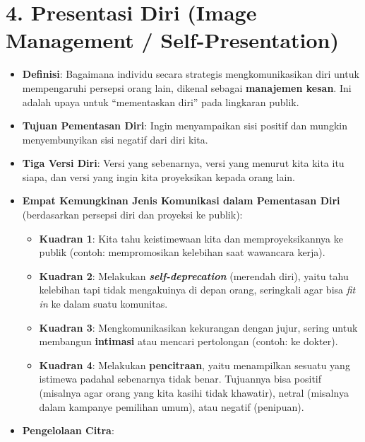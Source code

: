 \documentclass[
  letterpaper,
  DIV=11,
  numbers=noendperiod]{scrreprt}
\providecommand{\tightlist}{%
  \setlength{\itemsep}{0pt}\setlength{\parskip}{0pt}}
\begin{document}
\section{4. Presentasi Diri (Image Management /
Self-Presentation)}\label{presentasi-diri-image-management-self-presentation}

\begin{itemize}
\tightlist
\item
  \textbf{Definisi}: Bagaimana individu secara strategis
  mengkomunikasikan diri untuk mempengaruhi persepsi orang lain, dikenal
  sebagai \textbf{manajemen kesan}. Ini adalah upaya untuk ``mementaskan
  diri'' pada lingkaran publik.
\item
  \textbf{Tujuan Pementasan Diri}: Ingin menyampaikan sisi positif dan
  mungkin menyembunyikan sisi negatif dari diri kita.
\item
  \textbf{Tiga Versi Diri}: Versi yang sebenarnya, versi yang menurut
  kita kita itu siapa, dan versi yang ingin kita proyeksikan kepada
  orang lain.
\item
  \textbf{Empat Kemungkinan Jenis Komunikasi dalam Pementasan Diri}
  (berdasarkan persepsi diri dan proyeksi ke publik):

  \begin{itemize}
  \tightlist
  \item
    \textbf{Kuadran 1}: Kita tahu keistimewaan kita dan
    memproyeksikannya ke publik (contoh: mempromosikan kelebihan saat
    wawancara kerja).
  \item
    \textbf{Kuadran 2}: Melakukan \textbf{\emph{self-deprecation}}
    (merendah diri), yaitu tahu kelebihan tapi tidak mengakuinya di
    depan orang, seringkali agar bisa \emph{fit in} ke dalam suatu
    komunitas.
  \item
    \textbf{Kuadran 3}: Mengkomunikasikan kekurangan dengan jujur,
    sering untuk membangun \textbf{intimasi} atau mencari pertolongan
    (contoh: ke dokter).
  \item
    \textbf{Kuadran 4}: Melakukan \textbf{pencitraan}, yaitu menampilkan
    sesuatu yang istimewa padahal sebenarnya tidak benar. Tujuannya bisa
    positif (misalnya agar orang yang kita kasihi tidak khawatir),
    netral (misalnya dalam kampanye pemilihan umum), atau negatif
    (penipuan).
  \end{itemize}
\item
  \textbf{Pengelolaan Citra}:


\end{itemize}
\end{document}
